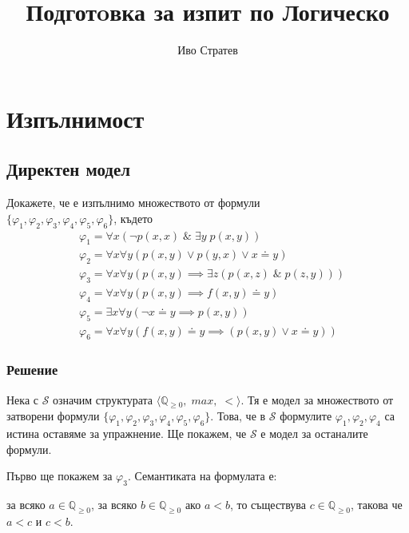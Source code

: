 \documentclass[17pt]{extarticle}
\title{Подготoвка за изпит по Логическо}
\author{Иво Стратев}
\begin{document}
\maketitle

\section{Изпълнимост}

\subsection{Директен модел}
Докажете, че е изпълнимо множеството от формули \\
\(\{\varphi_1, \varphi_2, \varphi_3, \varphi_4, \varphi_5, \varphi_6\}\), където
\begin{align*}
    & \varphi_1 = \forall x  (\lnot p(x, x) \;\&\;  \exists y \; p(x, y)) \\
    & \varphi_2 = \forall x \forall y (p(x, y) \lor p(y, x) \lor x \doteq y) \\
    & \varphi_3 = \forall x \forall y (p(x, y) \implies \exists z (p(x, z) \;\&\; p(z, y))) \\
    & \varphi_4 = \forall x \forall y (p(x, y) \implies f(x, y) \doteq y) \\
    & \varphi_5 = \exists x \forall y (\lnot x \doteq y \implies p(x, y)) \\
    & \varphi_6 = \forall x \forall y (f(x, y) \doteq y \implies (p(x, y) \lor x \doteq y))
\end{align*}

\subsubsection{Решение}
Нека с \(\mathcal S\) означим структурата \(\langle \mathbb{Q}_{\geq 0}, \; max, \; < \rangle\).
Тя е модел за множеството от затворени формули \(\{\varphi_1, \varphi_2, \varphi_3, \varphi_4, \varphi_5, \varphi_6\}\).
Това, че в \(\mathcal S\) формулите \(\varphi_1, \varphi_2, \varphi_4\) са истина оставяме за упражнение. Ще покажем, че \(\mathcal S\) е модел за останалите формули.

\vspace{5mm}

\par Първо ще покажем за \(\varphi_3\). Семантиката на формулата е:

\begin{displayquote}
за всяко \(a \in \mathbb{Q}_{\geq 0}\), за всяко \(b \in \mathbb{Q}_{\geq 0}\) ако \(a < b\), то съществува \(c \in \mathbb{Q}_{\geq 0}\), такова че \(a < c\) и \(c < b\).
\end{displayquote}
\end{document}
